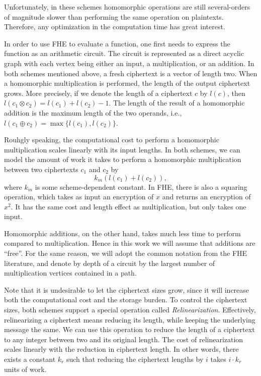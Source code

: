 \documentclass[11pt]{article} %
\theoremstyle{plain}
\theoremstyle{definition}
\begin{document}
Unfortunately, in these schemes homomorphic operations are still several-orders of magnitude slower than performing the same operation on plaintexts. Therefore, any optimization in the computation time has great interest.

In order to use FHE to evaluate a function, one first needs to express the function as an arithmetic circuit. The circuit is represented as a direct acyclic graph with each vertex being either an input, a multiplication, or an addition. In both schemes mentioned above, a fresh ciphertext is a vector of length two. When a homomorphic multiplication is performed, the length of the output ciphertext grows. More precisely, if we denote the 
length of a ciphertext $c$ by $l(c)$, then $l(  c_1 \otimes c_2 ) = l(c_1) +  l(c_2) - 1$. The length of the result of a homomorphic addition is the maximum length of the two operands, i.e., $l(  c_1 \oplus c_2 ) = \max\{l(c_1), l(c_2)\}$. 

Rouhgly speaking, the computational cost to perform a homomorphic multiplication scales linearly with its input lengths. In both schemes, 
we can model the amount of work it takes to perform a homomorphic multiplication between two ciphertexts $c_1$ and $c_2$ by 
\[
	k_m (l(c_1) + l(c_2)), 
\] 
where $k_m$ is some scheme-dependent constant. In FHE, there is also a squaring operation, which takes as input an encryption of $x$ and returns an encryption of $x^2$. It has the same cost and length effect as multiplication, but only takes one input. 


Homomorphic additions, on the other hand, takes much less time to perform compared to multiplication. Hence in this work we will assume that additions are ``free''.  For the same reason, we will adopt the common notation from the FHE literature, and denote by depth of a circuit by the largest number of multiplication vertices contained in a path. 

Note that it is undesirable to let the ciphertext sizes grow, since it will increase both the computational cost and the storage burden. To control the ciphertext sizes, both schemes support a special operation called \emph{Relinearization}. Effectively, relinearizing a ciphertext means reducing its length, while keeping the underlying message the same. We can use this operation to reduce the length of a ciphertext to any integer between two and its original length.  The cost of relinearization scales linearly with the reduction in ciphertext length. In other words, there exists a constant $k_r$ such that reducing the ciphertext lengths by $i$ takes $i \cdot k_r $ units of work. 
\end{document}
